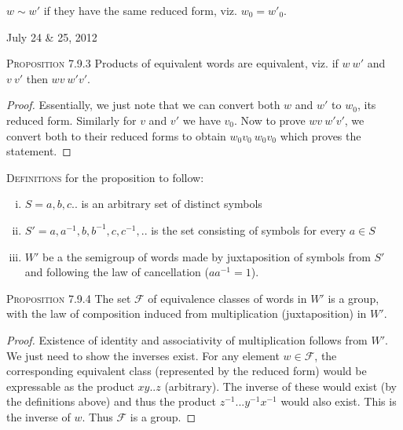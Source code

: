 \documentclass[12pt]{article}
\begin{document}
$w \sim w'$ if they have the same reduced form, viz. $w_{0}=w'_{0}$.
\begin{flushright} {\small July 24 \& 25, 2012} \end{flushright}
\textsc {Proposition 7.9.3} Products of equivalent words are equivalent, viz. if $w~w'$ and $v~v'$ then $wv~w'v'$.
\begin{proof}
Essentially, we just note that we can convert both $w$ and $w'$ to $w_{0}$, its reduced form. Similarly for $v$ and $v'$ we have $v_{0}$. Now to prove $wv~w'v'$, we convert both to their reduced forms to obtain $w_{0}v_{0}~w_{0}v_{0}$ which proves the statement.
\end{proof}
\textsc {Definitions} for the proposition to follow:
\begin{enumerate}[(i)]
\item $S = {a,b,c..}$ is an arbitrary set of distinct symbols
\item $S' = {a,a^{-1},b,b^{-1},c,c^{-1},..}$ is the set consisting of symbols for every $a \in S$
\item $W'$ be a the semigroup of words made by juxtaposition of symbols from $S'$ and following the law of cancellation ($aa^{-1}=1$).
\end{enumerate}

\textsc {Proposition 7.9.4} The set $\mathcal F$ of equivalence classes of words in $W'$ is a group, with the law of composition induced from multiplication (juxtaposition) in $W'$.
\begin{proof}
Existence of identity and associativity of multiplication follows from $W'$. We just need to show the inverses exist. For any element $w \in \mathcal F$, the corresponding equivalent class (represented by the reduced form) would be expressable as the product $xy..z$ (arbitrary). The inverse of these would exist (by the definitions above) and thus the product $z^{-1}...y^{-1}x^{-1}$ would also exist. This is the inverse of $w$. Thus $\mathcal F$ is a group.
\end{proof}
\end{document}
